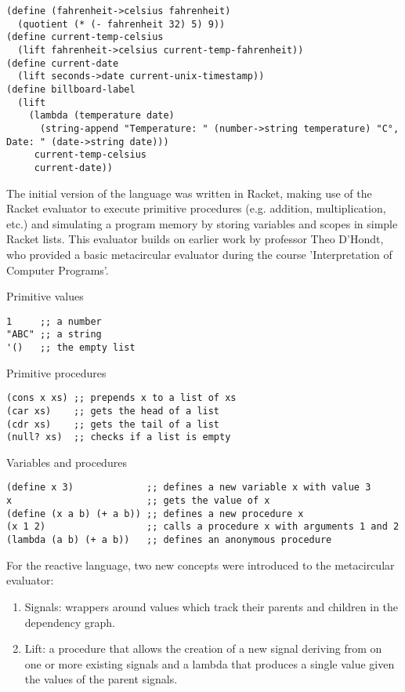 \begin{lstlisting}
(define (fahrenheit->celsius fahrenheit)
  (quotient (* (- fahrenheit 32) 5) 9))
(define current-temp-celsius
  (lift fahrenheit->celsius current-temp-fahrenheit))
(define current-date
  (lift seconds->date current-unix-timestamp))
(define billboard-label
  (lift
    (lambda (temperature date)
      (string-append "Temperature: " (number->string temperature) "C°, Date: " (date->string date)))
     current-temp-celsius
     current-date))   
\end{lstlisting}

The initial version of the language was written in Racket, making use of the Racket evaluator to execute primitive procedures (e.g. addition, multiplication, etc.) and simulating a program memory by storing variables and scopes in simple Racket lists. This evaluator builds on earlier work by professor Theo D'Hondt, who provided a basic metacircular evaluator during the course 'Interpretation of Computer Programs'. 

Primitive values
\begin{lstlisting}
1     ;; a number
"ABC" ;; a string
'()   ;; the empty list
\end{lstlisting}

Primitive procedures
\begin{lstlisting}
(cons x xs) ;; prepends x to a list of xs
(car xs)    ;; gets the head of a list
(cdr xs)    ;; gets the tail of a list
(null? xs)  ;; checks if a list is empty
\end{lstlisting}

Variables and procedures
\begin{lstlisting}
(define x 3)             ;; defines a new variable x with value 3
x                        ;; gets the value of x
(define (x a b) (+ a b)) ;; defines a new procedure x
(x 1 2)                  ;; calls a procedure x with arguments 1 and 2
(lambda (a b) (+ a b))   ;; defines an anonymous procedure
\end{lstlisting}

\newpage
For the reactive language, two new concepts were introduced to the metacircular evaluator:

\begin{enumerate}
	\item Signals: wrappers around values which track their parents and children in the dependency graph. 
	\item Lift: a procedure that allows the creation of a new signal deriving from on one or more existing signals and a lambda that produces a single value given the values of the parent signals.
\end{enumerate}

